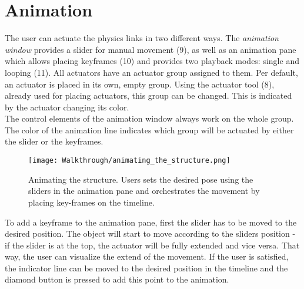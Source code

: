 \section{Animation}\label{sec:animation}
The user can actuate the physics links in two different ways. The \textit{animation window} provides a slider for manual movement (9), as well as an animation pane which allows placing keyframes (10) and provides two playback modes: single and looping (11). All actuators have an actuator group assigned to them. Per default, an actuator is placed in its own, empty group. Using the actuator tool (8), already used for placing actuators, this group can be changed. This is indicated by the actuator changing its color.\\
The control elements of the animation window always work on the whole group. The color of the animation line indicates which group will be actuated by either the slider or the keyframes.
\begin{figure}[h!]
    \texttt{[image: Walkthrough/animating\_the\_structure.png]}
    \centering
    \caption{Animating the structure. Users sets the desired pose using the sliders in the animation pane and orchestrates the movement by placing key-frames on the timeline.}
    \label{fig:animation}
\end{figure}
To add a keyframe to the animation pane, first the slider has to be moved to the desired position. The object will start to move according to the sliders position - if the slider is at the top, the actuator will be fully extended and vice versa. That way, the user can visualize the extend of the movement. If the user is satisfied, the indicator line can be moved to the desired position in the timeline and the diamond button is pressed to add this point to the animation.

